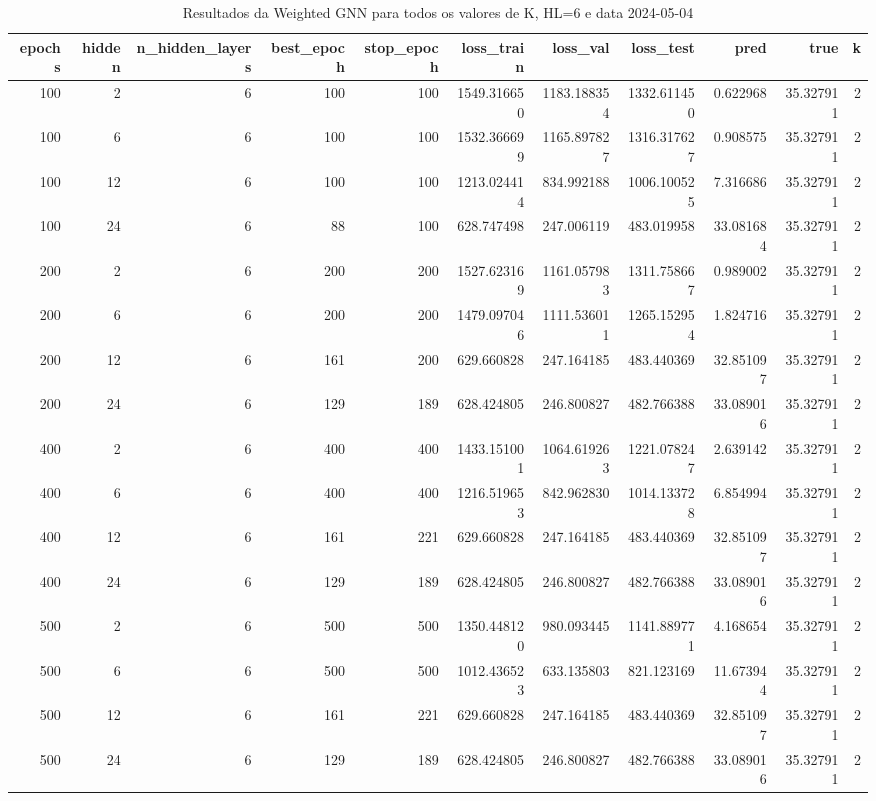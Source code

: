 \begin{table}
\caption{Resultados da Weighted GNN para todos os valores de K, HL=6 e data 2024-05-04}
\label{tab:weighted_gnn_results_allk_hl6_d20240504}
\begin{tabular}{rrrrrrrrrrr}
\toprule
epochs & hidden & n\_hidden\_layers & best\_epoch & stop\_epoch & loss\_train & loss\_val & loss\_test & pred & true & k \\
\midrule
100 & 2 & 6 & 100 & 100 & 1549.316650 & 1183.188354 & 1332.611450 & 0.622968 & 35.327911 & 2 \\
100 & 6 & 6 & 100 & 100 & 1532.366699 & 1165.897827 & 1316.317627 & 0.908575 & 35.327911 & 2 \\
100 & 12 & 6 & 100 & 100 & 1213.024414 & 834.992188 & 1006.100525 & 7.316686 & 35.327911 & 2 \\
100 & 24 & 6 & 88 & 100 & 628.747498 & 247.006119 & 483.019958 & 33.081684 & 35.327911 & 2 \\
200 & 2 & 6 & 200 & 200 & 1527.623169 & 1161.057983 & 1311.758667 & 0.989002 & 35.327911 & 2 \\
200 & 6 & 6 & 200 & 200 & 1479.097046 & 1111.536011 & 1265.152954 & 1.824716 & 35.327911 & 2 \\
200 & 12 & 6 & 161 & 200 & 629.660828 & 247.164185 & 483.440369 & 32.851097 & 35.327911 & 2 \\
200 & 24 & 6 & 129 & 189 & 628.424805 & 246.800827 & 482.766388 & 33.089016 & 35.327911 & 2 \\
400 & 2 & 6 & 400 & 400 & 1433.151001 & 1064.619263 & 1221.078247 & 2.639142 & 35.327911 & 2 \\
400 & 6 & 6 & 400 & 400 & 1216.519653 & 842.962830 & 1014.133728 & 6.854994 & 35.327911 & 2 \\
400 & 12 & 6 & 161 & 221 & 629.660828 & 247.164185 & 483.440369 & 32.851097 & 35.327911 & 2 \\
400 & 24 & 6 & 129 & 189 & 628.424805 & 246.800827 & 482.766388 & 33.089016 & 35.327911 & 2 \\
500 & 2 & 6 & 500 & 500 & 1350.448120 & 980.093445 & 1141.889771 & 4.168654 & 35.327911 & 2 \\
500 & 6 & 6 & 500 & 500 & 1012.436523 & 633.135803 & 821.123169 & 11.673944 & 35.327911 & 2 \\
500 & 12 & 6 & 161 & 221 & 629.660828 & 247.164185 & 483.440369 & 32.851097 & 35.327911 & 2 \\
500 & 24 & 6 & 129 & 189 & 628.424805 & 246.800827 & 482.766388 & 33.089016 & 35.327911 & 2 \\

\end{tabular}
\end{table}
